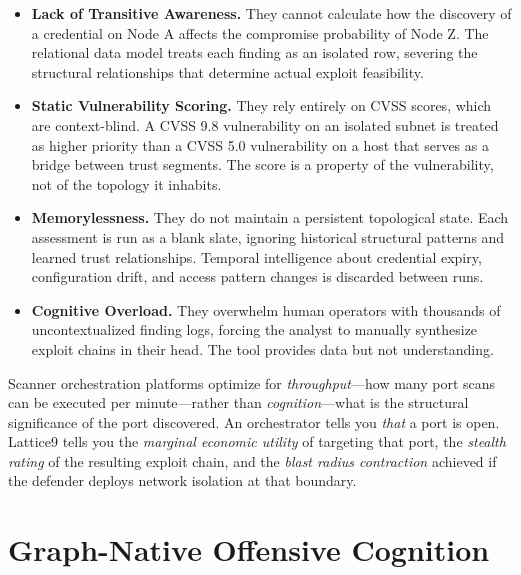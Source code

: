 \documentclass[11pt,a4paper]{article}
\theoremstyle{definition}
\numberwithin{equation}{section}
\begin{document}
\begin{itemize}[leftmargin=2em]
    \item \textbf{Lack of Transitive Awareness.} They cannot calculate how the discovery of a credential on Node A affects the compromise probability of Node Z. The relational data model treats each finding as an isolated row, severing the structural relationships that determine actual exploit feasibility.

    \item \textbf{Static Vulnerability Scoring.} They rely entirely on CVSS scores, which are context-blind. A CVSS 9.8 vulnerability on an isolated subnet is treated as higher priority than a CVSS 5.0 vulnerability on a host that serves as a bridge between trust segments. The score is a property of the vulnerability, not of the topology it inhabits.

    \item \textbf{Memorylessness.} They do not maintain a persistent topological state. Each assessment is run as a blank slate, ignoring historical structural patterns and learned trust relationships. Temporal intelligence about credential expiry, configuration drift, and access pattern changes is discarded between runs.

    \item \textbf{Cognitive Overload.} They overwhelm human operators with thousands of uncontextualized finding logs, forcing the analyst to manually synthesize exploit chains in their head. The tool provides data but not understanding.
\end{itemize}

\begin{operationalnote}
Scanner orchestration platforms optimize for \emph{throughput}---how many port scans can be executed per minute---rather than \emph{cognition}---what is the structural significance of the port discovered. An orchestrator tells you \emph{that} a port is open. Lattice9 tells you the \emph{marginal economic utility} of targeting that port, the \emph{stealth rating} of the resulting exploit chain, and the \emph{blast radius contraction} achieved if the defender deploys network isolation at that boundary.
\end{operationalnote}

\section{Graph-Native Offensive Cognition}\label{sec:graphnative}
\end{document}
